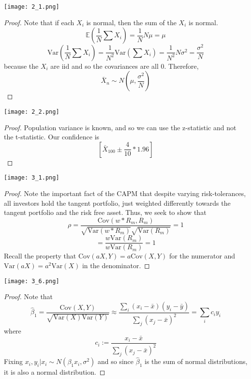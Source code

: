 \documentclass[12pt]{scrartcl}
\newcommand{\E}{\mathbb{E}}
\newcommand{\V}{\text{Var}}
\newcommand{\C}{\text{Cov}}
\begin{document}
\texttt{[image: 2\_1.png]}

\begin{proof}
  Note that if each $X_i$ is normal, then the sum of the $X_i$ is normal.
  \[\E(\frac{1}{N}\sum X_i) = \frac{1}{N}N\mu = \mu\]
  \[\V(\frac{1}{N}\sum X_i) = \frac{1}{N^2}\V(\sum X_i) = \frac{1}{N^2} N\sigma^2 = \frac{\sigma^2}{N}\]
  because the $X_i$ are iid and so the covariances are all $0$. Therefore, 
  \[\bar{X}_n \sim N(\mu, \frac{\sigma^2}{N})\]
\end{proof}

\texttt{[image: 2\_2.png]}

\begin{proof}
  Population variance is known, and so we can use the z-statistic and not the 
  t-statistic. Our confidence is 
  \[[\bar{X}_{100} \pm \frac{4}{10} * 1.96]\]
\end{proof}

\texttt{[image: 3\_1.png]}

\begin{proof}
  Note the important fact of the CAPM that despite varying risk-tolerances, all 
  investors hold the tangent portfolio, just weighted differently towards the tangent portfolio and the 
  risk free asset. Thus, we seek to show that 
  \[\rho = \dfrac{\C(w * R_m, R_m)}{\sqrt{\V(w * R_m)} \sqrt{\V(R_m)}} = 1\]
  \[= \dfrac{w \V(R_m)}{w \V(R_m)} = 1\]
  Recall the property that $\C(aX, Y) = a\C(X, Y)$ for the numerator and 
  $\V(aX) = a^2\V(X)$ in the denominator.
\end{proof}

\texttt{[image: 3\_6.png]}

\begin{proof}
  Note that
  \[\hat{\beta}_1 = \dfrac{\C(X, Y)}{\sqrt{\V(X)\V(Y)}} \approx \dfrac{\sum_i (x_i - \bar{x})(y_i - \bar{y})}{\sum_j (x_j - \bar{x})^2} = \sum_i c_i y_i\]
  where 
  \[c_i := \dfrac{x_i - \bar{x}}{\sum_j (x_j - \bar{x})^2}\]
  Fixing $x_i, y_i | x_i \sim N(\beta_1x_i, \sigma^2)$ and so since $\hat{\beta}_1$ is the sum of normal distributions, 
  it is also a normal distribution.

\end{proof}
\end{document}
